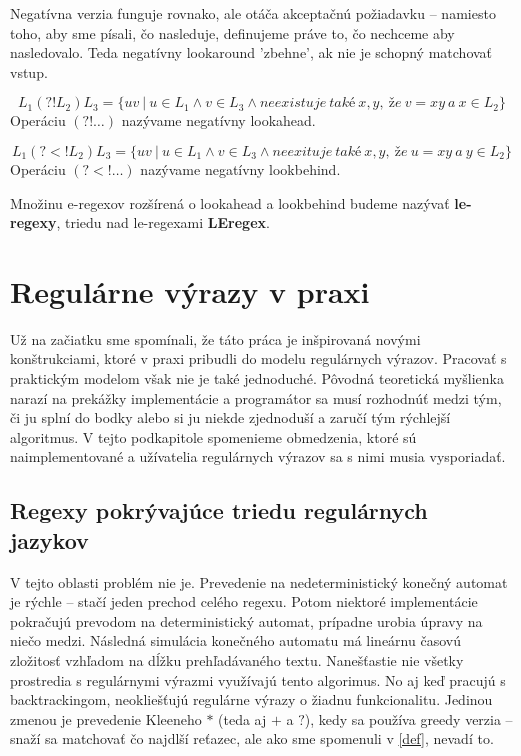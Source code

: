 Negatívna verzia funguje rovnako, ale otáča akceptačnú požiadavku -- namiesto toho, aby sme písali, čo nasleduje, definujeme práve to, čo nechceme aby nasledovalo. Teda negatívny lookaround 'zbehne', ak nie je schopný matchovať vstup.

\begin{df}
$$ L_{1}(?!L_{2})L_{3} = \lbrace uv ~|~ u \in L_{1} \land v \in L_{3} \land neexistuje~také~x,y,~že~v=xy~a~x \in L_2 \rbrace $$ Operáciu $(?!\dots)$ nazývame negatívny lookahead.
\end{df}

\begin{df}
$$ L_{1}(?<!L_{2})L_{3} = \lbrace uv ~|~ u \in L_{1} \land v \in L_{3} \land neexituje~také~x,y,~že~u=xy~a~y \in L_2 \rbrace $$ Operáciu $(?<!\dots)$ nazývame negatívny lookbehind.
\end{df}

\begin{df}
Množinu e-regexov rozšírená o lookahead a lookbehind budeme nazývať \textbf{le-regexy}, triedu nad le-regexami \textbf{LEregex}.
\end{df}

\section{Regulárne výrazy v praxi}
\label{prax}

Už na začiatku sme spomínali, že táto práca je inšpirovaná novými konštrukciami, ktoré v praxi pribudli do modelu regulárnych výrazov. Pracovať s praktickým modelom však nie je také jednoduché. Pôvodná teoretická myšlienka narazí na prekážky implementácie a programátor sa musí rozhodnúť medzi tým, či ju splní do bodky alebo si ju niekde zjednoduší a zaručí tým rýchlejší algoritmus. V tejto podkapitole spomenieme obmedzenia, ktoré sú naimplementované a užívatelia regulárnych výrazov sa s nimi musia vysporiadať.

\subsection*{Regexy pokrývajúce triedu regulárnych jazykov}
\label{praxregex}

V tejto oblasti problém nie je. Prevedenie na nedeterministický konečný automat je rýchle -- stačí jeden prechod celého regexu. Potom niektoré implementácie pokračujú prevodom na deterministický automat, prípadne urobia úpravy na niečo medzi. Nás\-led\-ná simulácia konečného automatu má lineárnu časovú zložitosť vzhľadom na dĺžku prehľadávaného textu\cite{ExtendedRegexPower}. Nanešťastie nie všetky prostredia s regulárnymi výrazmi využívajú tento algorimus. No aj keď pracujú s backtrackingom, neokliešťujú regulárne výrazy o žiadnu funkcionalitu. Jedinou zmenou je prevedenie Kleeneho $*$ (teda aj $+$ a $?$), kedy sa používa greedy verzia -- snaží sa matchovať čo najdlší reťazec, ale ako sme spomenuli v \ref{def}, nevadí to.

